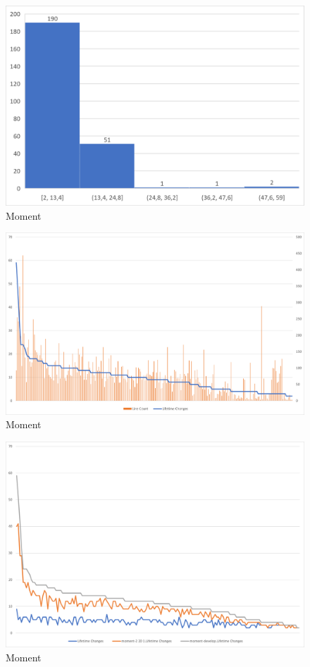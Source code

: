 \begin{figure}[H]
    \centering
    \includegraphics[width=1\textwidth]{images/moment/moment-dev-hist.png}
    \caption{Moment}
    \label{fig:moment-2.10.5-changes}
\end{figure}

\begin{figure}[H]
    \centering
    \includegraphics[width=1\textwidth]{images/moment/moment-dev-lines.png}
    \caption{Moment}
    \label{fig:moment-2.10.5-changes}
\end{figure}

\begin{figure}[H]
    \centering
    \includegraphics[width=1\textwidth]{images/moment/moment-all-changes.png}
    \caption{Moment}
    \label{fig:moment-2.10.5-changes}
\end{figure}

